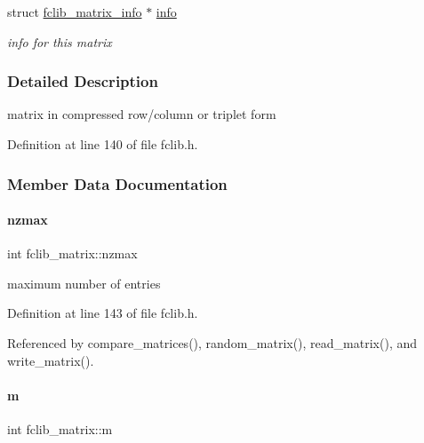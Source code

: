 \begin{DoxyCompactItemize}
struct \mbox{\hyperlink{structfclib__matrix__info}{fclib\+\_\+matrix\+\_\+info}} $\ast$ \mbox{\hyperlink{structfclib__matrix_ac0af227334c5b0a13a3222c8f04add36}{info}}
\begin{DoxyCompactList}\small\item\em info for this matrix \end{DoxyCompactList}\end{DoxyCompactItemize}


\subsubsection{Detailed Description}
matrix in compressed row/column or triplet form 

Definition at line 140 of file fclib.\+h.



\subsubsection{Member Data Documentation}
\mbox{\label{structfclib__matrix_ad59323011143dc70ef74f4377279e0d0}} 
\paragraph{\texorpdfstring{nzmax}{nzmax}}
{\footnotesize\ttfamily int fclib\+\_\+matrix\+::nzmax}



maximum number of entries 



Definition at line 143 of file fclib.\+h.



Referenced by compare\+\_\+matrices(), random\+\_\+matrix(), read\+\_\+matrix(), and write\+\_\+matrix().

\mbox{\label{structfclib__matrix_aaec2a835fcc339c3fb84227e2f7b861b}} 
\paragraph{\texorpdfstring{m}{m}}
{\footnotesize\ttfamily int fclib\+\_\+matrix\+::m}



